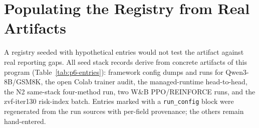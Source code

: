 \section{Populating the Registry from Real Artifacts}
\label{sec:p6-population}

A registry seeded with hypothetical entries would not test the artifact against
real reporting gaps. All \NSTACK{} seed stack records derive from concrete
artifacts of this program (Table~\ref{tab:p6-entries}): framework config dumps
and runs for Qwen3-8B/GSM8K, the open Colab trainer audit, the managed-runtime
head-to-head, the N2 same-stack four-method run, two W\&B PPO/REINFORCE runs,
and the zvf-iter130 risk-index batch. Entries marked with a \texttt{run\_config}
block were regenerated from the run sources with per-field provenance; the
others remain hand-entered.

\begin{table}[t]
\centering
\caption{The \NSTACK{} seed stack entries. Badge = MIN-REPORT auditor score
(0--100; Section~\ref{sec:p6-query}); spec.\ cov.\ = fraction of
\texttt{stackdiff} fields known for the entry. Exec.\ = execution mode with
seed count: \emph{run} (completed training run), \emph{toy run} (toy-scale
Colab run), \emph{dry-run} (unexecuted placeholder; \texttt{run\_config}
\texttt{execution.mode}${}=$\texttt{dryrun}), \emph{fixture} (risk-index
fixture, not a training run). Mean ZVF is the informational
\texttt{outcomes} field where present. Model strings drop the organization
prefix, and the \texttt{-Base} suffix is printed in one case
(\texttt{stackdiff} compares case-insensitively). Method labels:
aero~\citep{zhang2026aero}, areal~\citep{areal2025}, es~\citep{es2025},
gift~\citep{gift2025}, cppo~\citep{lin2025cppo}, mcgrpo~\citep{mcgrpo2025},
ngrpo~\citep{nan2025ngrpo}, scafgrpo~\citep{zhang2025scaffgrpo}. Rows are
regenerated by \texttt{analysis\_publication\_fixes/p6\_registry\_numbers.py}
from \texttt{registry/query.py}.}
\label{tab:p6-entries}
\scriptsize
{}
\end{table}

